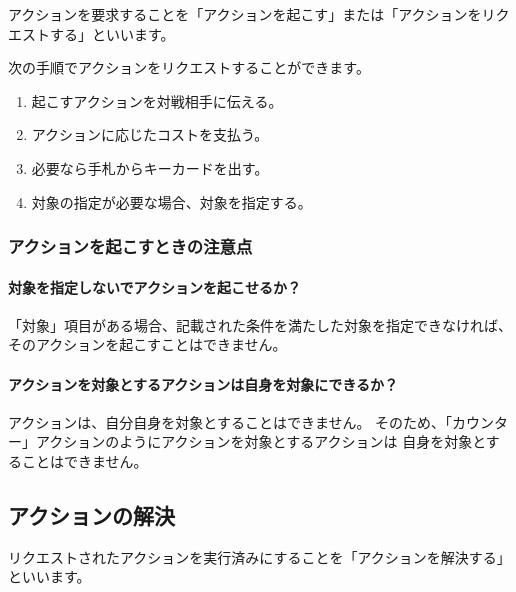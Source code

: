 \documentclass[letterpaper,10pt,dvipdfmx]{sphinxmanual}
\begin{document}
\sphinxAtStartPar
アクションを要求することを「アクションを起こす」または「アクションをリクエストする」といいます。

\sphinxAtStartPar
次の手順でアクションをリクエストすることができます。
\begin{enumerate}
%
\item {} 
\sphinxAtStartPar
起こすアクションを対戦相手に伝える。

\item {} 
\sphinxAtStartPar
アクションに応じたコストを支払う。

\item {} 
\sphinxAtStartPar
必要なら手札からキーカードを出す。

\item {} 
\sphinxAtStartPar
対象の指定が必要な場合、対象を指定する。

\end{enumerate}


\subsubsection{アクションを起こすときの注意点}
\label{\detokenize{common/common:id25}}

\paragraph{対象を指定しないでアクションを起こせるか？}
\label{\detokenize{common/common:id26}}
\sphinxAtStartPar
「対象」項目がある場合、記載された条件を満たした対象を指定できなければ、
そのアクションを起こすことはできません。


\paragraph{アクションを対象とするアクションは自身を対象にできるか？}
\label{\detokenize{common/common:id27}}
\sphinxAtStartPar
アクションは、自分自身を対象とすることはできません。
そのため、「カウンター」アクションのようにアクションを対象とするアクションは
自身を対象とすることはできません。


\subsection{アクションの解決}
\label{\detokenize{common/common:id28}}
\sphinxAtStartPar
リクエストされたアクションを実行済みにすることを「アクションを解決する」といいます。
\end{document}
